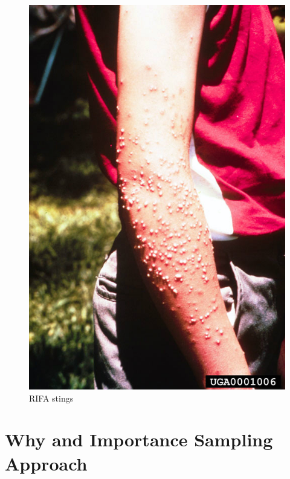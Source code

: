 \documentclass[9pt]{beamer}
\begin{document}
\begin{frame}
\begin{figure}
\begin{minipage}{0.4\textwidth}
\includegraphics[scale=0.1]{rifa_stings.png}
\caption{RIFA stings}
\end{minipage}
\end{figure}
\end{frame}

\section{Why and Importance Sampling Approach}
\end{document}
